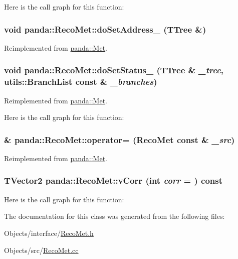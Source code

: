 Here is the call graph for this function:\hypertarget{classpanda_1_1RecoMet_a6b54b0213c71dc2208c24bae6f709e2c}{
\subsubsection[{doSetAddress\_\-}]{\setlength{\rightskip}{0pt plus 5cm}void panda::RecoMet::doSetAddress\_\- (TTree \&)}}
\label{classpanda_1_1RecoMet_a6b54b0213c71dc2208c24bae6f709e2c}


Reimplemented from \hyperlink{classpanda_1_1Met_aa3d27a3592eefcbd69ff73c6c8e70112}{panda::Met}.\hypertarget{classpanda_1_1RecoMet_ada709eee42912be17dc1575083bc5f99}{
\subsubsection[{doSetStatus\_\-}]{\setlength{\rightskip}{0pt plus 5cm}void panda::RecoMet::doSetStatus\_\- (TTree \& {\em \_\-tree}, \/  {\bf utils::BranchList} const \& {\em \_\-branches})}}
\label{classpanda_1_1RecoMet_ada709eee42912be17dc1575083bc5f99}


Reimplemented from \hyperlink{classpanda_1_1Met_a3ed51e1633313fa1fb5f5dbda38108c8}{panda::Met}.

Here is the call graph for this function:\hypertarget{classpanda_1_1RecoMet_a9457a28604d28d4f06346a121874dc27}{
\subsubsection[{operator=}]{ \& panda::RecoMet::operator= ({\bf RecoMet} const \& {\em \_\-src})}}
\label{classpanda_1_1RecoMet_a9457a28604d28d4f06346a121874dc27}


Reimplemented from \hyperlink{classpanda_1_1Met_a75a8d56e25e884dfd9bdeff20b3d0b61}{panda::Met}.\hypertarget{classpanda_1_1RecoMet_a9fedbcdca412dc52c25330f1e3900da1}{
\subsubsection[{vCorr}]{\setlength{\rightskip}{0pt plus 5cm}TVector2 panda::RecoMet::vCorr (int {\em corr} = {}) const}}
\label{classpanda_1_1RecoMet_a9fedbcdca412dc52c25330f1e3900da1}


Here is the call graph for this function:

The documentation for this class was generated from the following files:\begin{DoxyCompactItemize}
\item 
Objects/interface/\hyperlink{RecoMet_8h}{RecoMet.h}\item 
Objects/src/\hyperlink{RecoMet_8cc}{RecoMet.cc}\end{DoxyCompactItemize}

